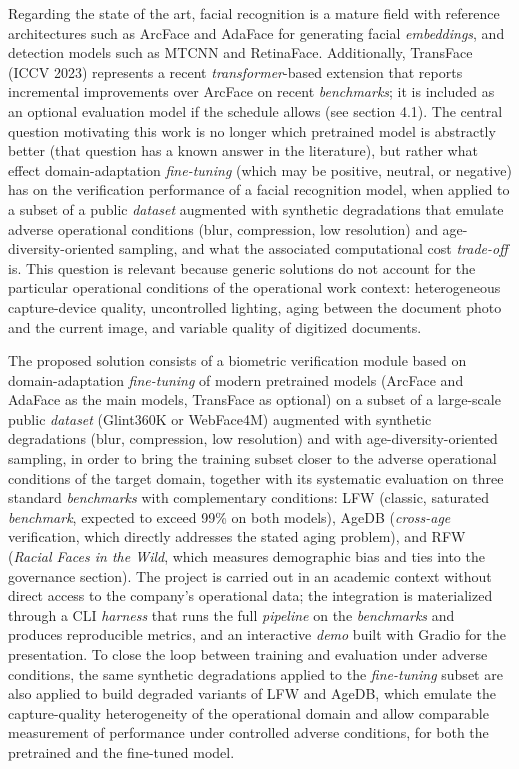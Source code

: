 \documentclass[
  11pt, %
]{charter}
\begin{document}
Regarding the state of the art, facial recognition is a mature field with reference architectures such as ArcFace and AdaFace for generating facial \textit{embeddings}, and detection models such as MTCNN and RetinaFace. Additionally, TransFace (ICCV 2023) represents a recent \textit{transformer}-based extension that reports incremental improvements over ArcFace on recent \textit{benchmarks}; it is included as an optional evaluation model if the schedule allows (see section 4.1). The central question motivating this work is no longer which pretrained model is abstractly better (that question has a known answer in the literature), but rather what effect domain-adaptation \textit{fine-tuning} (which may be positive, neutral, or negative) has on the verification performance of a facial recognition model, when applied to a subset of a public \textit{dataset} augmented with synthetic degradations that emulate adverse operational conditions (blur, compression, low resolution) and age-diversity-oriented sampling, and what the associated computational cost \textit{trade-off} is. This question is relevant because generic solutions do not account for the particular operational conditions of the operational work context: heterogeneous capture-device quality, uncontrolled lighting, aging between the document photo and the current image, and variable quality of digitized documents.

The proposed solution consists of a biometric verification module based on domain-adaptation \textit{fine-tuning} of modern pretrained models (ArcFace and AdaFace as the main models, TransFace as optional) on a subset of a large-scale public \textit{dataset} (Glint360K or WebFace4M) augmented with synthetic degradations (blur, compression, low resolution) and with age-diversity-oriented sampling, in order to bring the training subset closer to the adverse operational conditions of the target domain, together with its systematic evaluation on three standard \textit{benchmarks} with complementary conditions: LFW (classic, saturated \textit{benchmark}, expected to exceed 99\% on both models), AgeDB (\textit{cross-age} verification, which directly addresses the stated aging problem), and RFW (\textit{Racial Faces in the Wild}, which measures demographic bias and ties into the governance section). The project is carried out in an academic context without direct access to the company's operational data; the integration is materialized through a CLI \textit{harness} that runs the full \textit{pipeline} on the \textit{benchmarks} and produces reproducible metrics, and an interactive \textit{demo} built with Gradio for the presentation. To close the loop between training and evaluation under adverse conditions, the same synthetic degradations applied to the \textit{fine-tuning} subset are also applied to build degraded variants of LFW and AgeDB, which emulate the capture-quality heterogeneity of the operational domain and allow comparable measurement of performance under controlled adverse conditions, for both the pretrained and the fine-tuned model.
\end{document}
